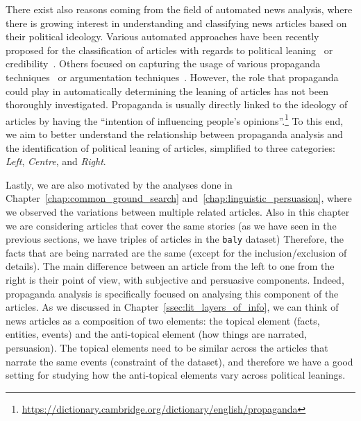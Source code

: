 There exist also reasons coming from the field of automated news analysis, where there is growing interest in understanding and classifying news articles based on their political ideology.
Various automated approaches have been recently proposed for the classification of articles with regards to political leaning~\citep{baly2020we} or credibility~\citep{horne2018assessing}. Others focused on capturing the usage of various propaganda techniques~\citep{da2019fine} or argumentation techniques~\citep{lippi2016argumentation}. However, the role that propaganda could play in automatically determining the leaning of articles has not been thoroughly investigated.
Propaganda is usually directly linked to the ideology of articles by having the ``intention of influencing people's opinions''.\footnote{\url{https://dictionary.cambridge.org/dictionary/english/propaganda}} To this end, we aim to better understand the relationship between propaganda analysis and the identification of political leaning of articles, simplified to three categories: \textit{Left}, \textit{Centre}, and \textit{Right}.

Lastly, we are also motivated by the analyses done in Chapter~\ref{chap:common_ground_search} and~\ref{chap:linguistic_persuasion}, where we observed the variations between multiple related articles.
Also in this chapter we are considering articles that cover the same stories (as we have seen in the previous sections, we have triples of articles in the \texttt{baly} dataset)
Therefore, the facts that are being narrated are the same (except for the inclusion/exclusion of details). The main difference between an article from the left to one from the right is their point of view, with subjective and persuasive components.
Indeed, propaganda analysis is specifically focused on analysing this component of the articles.
As we discussed in Chapter~\ref{ssec:lit_layers_of_info}, we can think of news articles as a composition of two elements: the topical element (facts, entities, events) and the anti-topical element (how things are narrated, persuasion).
The topical elements need to be similar across the articles that narrate the same events (constraint of the dataset), and therefore we have a good setting for studying how the anti-topical elements vary across political leanings.

